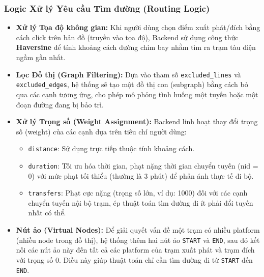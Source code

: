 \documentclass[12pt,a4paper]{article}
\begin{document}
\subsubsection{Logic Xử lý Yêu cầu Tìm đường (Routing Logic)}
\begin{itemize}
    \item \textbf{Xử lý Tọa độ không gian:} Khi người dùng chọn điểm xuất phát/đích bằng cách click trên bản đồ (truyền vào tọa độ), Backend sử dụng công thức \textbf{Haversine} để tính khoảng cách đường chim bay nhằm tìm ra trạm tàu điện ngầm gần nhất.
    \item \textbf{Lọc Đồ thị (Graph Filtering):} Dựa vào tham số \texttt{excluded\_lines} và \texttt{excluded\_edges}, hệ thống sẽ tạo một đồ thị con (subgraph) bằng cách bỏ qua các cạnh tương ứng, cho phép mô phỏng tình huống một tuyến hoặc một đoạn đường đang bị bảo trì.
    \item \textbf{Xử lý Trọng số (Weight Assignment):} Backend linh hoạt thay đổi trọng số (weight) của các cạnh dựa trên tiêu chí người dùng:
    \begin{itemize}
        \item \texttt{distance}: Sử dụng trực tiếp thuộc tính khoảng cách.
        \item \texttt{duration}: Tối ưu hóa thời gian, phạt nặng thời gian chuyển tuyến (nid = 0) với mức phạt tối thiểu (thường là 3 phút) để phản ánh thực tế đi bộ.
        \item \texttt{transfers}: Phạt cực nặng (trọng số lớn, ví dụ: 1000) đối với các cạnh chuyển tuyến nội bộ trạm, ép thuật toán tìm đường đi ít phải đổi tuyến nhất có thể.
    \end{itemize}
    \item \textbf{Nút ảo (Virtual Nodes):} Để giải quyết vấn đề một trạm có nhiều platform (nhiều node trong đồ thị), hệ thống thêm hai nút ảo \texttt{START} và \texttt{END}, sau đó kết nối các nút ảo này đến tất cả các platform của trạm xuất phát và trạm đích với trọng số 0. Điều này giúp thuật toán chỉ cần tìm đường đi từ \texttt{START} đến \texttt{END}.
\end{itemize}
\end{document}
